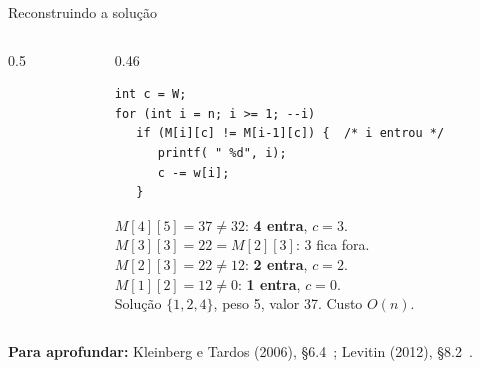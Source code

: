\documentclass[aspectratio=169,xcolor=table]{beamer}
\newcommand{\marca}[3]{\fill[#3] ({#2*0.75-0.375},{-#1*0.5-0.25}) rectangle +(0.75,0.5);}
\newcommand{\gradeMochila}[1]{%
  \foreach \c in {0,...,5}
    \node[font=\tiny\bfseries, gray!60!black] at ({\c*0.75},0.45) {$c{=}\c$};
  \foreach \r/\rot in {0/{$i{=}0$}, 1/{$1\;(2,12)$}, 2/{$2\;(1,10)$}, 3/{$3\;(3,20)$},
                       4/{$4\;(2,15)$}}
    \node[font=\tiny, anchor=east] at (-0.42,{-\r*0.5}) {\rot};
  \foreach \lin [count=\i from 0] in #1
    \foreach \x [count=\c from 0] in \lin
      \node[cel] at ({\c*0.75},{-\i*0.5}) {\x};%
}
\newcommand{\valoresM}{{0,0,0,0,0,0},{0,0,12,12,12,12},{0,10,12,22,22,22},%
  {0,10,12,22,30,32},{0,10,15,25,30,37}}
\newcommand{\fonte}[1]{%
  \vfill
  {\tiny\color{gray!55!black}\textbf{Para aprofundar:} #1\par}%
}
\begin{document}
\begin{frame}[fragile]{Reconstruindo a solução}
  \begin{columns}[c]
    \begin{column}{0.5\textwidth}
      \centering
    \end{column}
    \begin{column}{0.46\textwidth}
\begin{lstlisting}[basicstyle=\ttfamily\tiny]
int c = W;
for (int i = n; i >= 1; --i)
   if (M[i][c] != M[i-1][c]) {  /* i entrou */
      printf( " %d", i);
      c -= w[i];
   }
\end{lstlisting}
      \scriptsize
      $M[4][5]=37 \ne 32$: \textbf{4 entra}, $c=3$.\\
      $M[3][3]=22 = M[2][3]$: 3 fica fora.\\
      $M[2][3]=22 \ne 12$: \textbf{2 entra}, $c=2$.\\
      $M[1][2]=12 \ne 0$: \textbf{1 entra}, $c=0$.\\[2pt]
      Solução $\{1,2,4\}$, peso 5, valor 37. Custo $O(n)$.
    \end{column}
  \end{columns}
  \fonte{Kleinberg e Tardos (2006), \S 6.4~\cite{kleinberg2006algorithm};
    Levitin (2012), \S 8.2~\cite{levitin2012introduction}.}
\end{frame}
\end{document}
